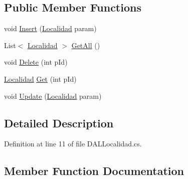 \subsection*{Public Member Functions}
\begin{DoxyCompactItemize}
\item 
void \hyperlink{classprj_progra_i_i_i_1_1_layer_1_1_d_a_l_1_1_d_a_l_localidad_ac4a6e2c416a8372500396dcdb78a9f90}{Insert} (\hyperlink{classprj_progra_i_i_i_1_1_layer_1_1_entities_1_1_localidad}{Localidad} param)
\item 
List$<$ \hyperlink{classprj_progra_i_i_i_1_1_layer_1_1_entities_1_1_localidad}{Localidad} $>$ \hyperlink{classprj_progra_i_i_i_1_1_layer_1_1_d_a_l_1_1_d_a_l_localidad_aeac57d97dd6728e382c3b52a8ab551d3}{Get\+All} ()
\item 
void \hyperlink{classprj_progra_i_i_i_1_1_layer_1_1_d_a_l_1_1_d_a_l_localidad_a10941dad044a07cd5611800e08db6f44}{Delete} (int p\+Id)
\item 
\hyperlink{classprj_progra_i_i_i_1_1_layer_1_1_entities_1_1_localidad}{Localidad} \hyperlink{classprj_progra_i_i_i_1_1_layer_1_1_d_a_l_1_1_d_a_l_localidad_a0763adaaedb581f36a311344b109ef83}{Get} (int p\+Id)
\item 
void \hyperlink{classprj_progra_i_i_i_1_1_layer_1_1_d_a_l_1_1_d_a_l_localidad_a6d28e0253b702b4cd246f15bda5505eb}{Update} (\hyperlink{classprj_progra_i_i_i_1_1_layer_1_1_entities_1_1_localidad}{Localidad} param)
\end{DoxyCompactItemize}


\subsection{Detailed Description}


Definition at line 11 of file D\+A\+L\+Localidad.\+cs.



\subsection{Member Function Documentation}
\hypertarget{classprj_progra_i_i_i_1_1_layer_1_1_d_a_l_1_1_d_a_l_localidad_a10941dad044a07cd5611800e08db6f44}{}\label{classprj_progra_i_i_i_1_1_layer_1_1_d_a_l_1_1_d_a_l_localidad_a10941dad044a07cd5611800e08db6f44} 
